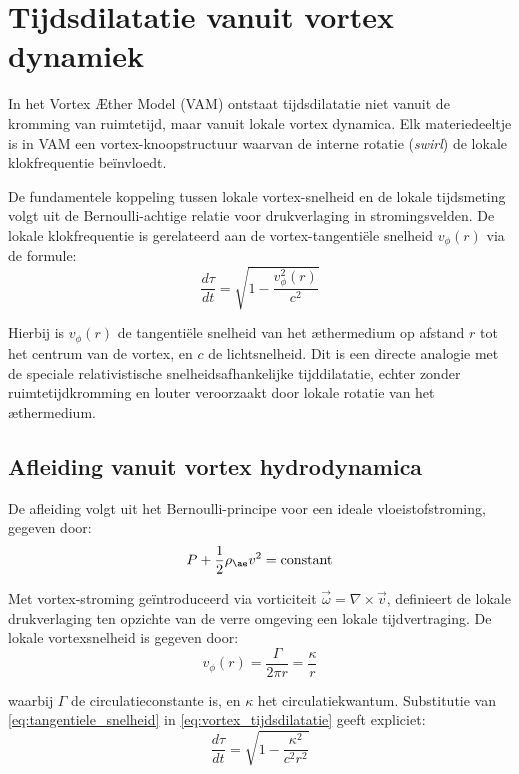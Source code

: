 \section{Tijdsdilatatie vanuit vortex dynamiek}

In het Vortex Æther Model (VAM) ontstaat tijdsdilatatie niet vanuit de kromming van ruimtetijd, maar vanuit lokale vortex dynamica. Elk materiedeeltje is in VAM een vortex-knoopstructuur waarvan de interne rotatie (\textit{swirl}) de lokale klokfrequentie beïnvloedt.

De fundamentele koppeling tussen lokale vortex-snelheid en de lokale tijdsmeting volgt uit de Bernoulli-achtige relatie voor drukverlaging in stromingsvelden. De lokale klokfrequentie is gerelateerd aan de vortex-tangentiële snelheid $v_{\phi}(r)$ via de formule:
\begin{equation}\label{eq:vortex_tijdsdilatatie}
    \frac{d\tau}{dt} = \sqrt{1 - \frac{v_{\phi}^2(r)}{c^2}}
\end{equation}

Hierbij is $v_{\phi}(r)$ de tangentiële snelheid van het æthermedium op afstand $r$ tot het centrum van de vortex, en $c$ de lichtsnelheid. Dit is een directe analogie met de speciale relativistische snelheidsafhankelijke tijddilatatie, echter zonder ruimtetijdkromming en louter veroorzaakt door lokale rotatie van het æthermedium.

\subsection{Afleiding vanuit vortex hydrodynamica}

De afleiding volgt uit het Bernoulli-principe voor een ideale vloeistofstroming, gegeven door:
\begin{equation}\label{eq:Bernoulli}
    P + \frac{1}{2}\rho_{\ae} v^2 = \text{constant}
\end{equation}

Met vortex-stroming geïntroduceerd via vorticiteit $\vec{\omega} = \nabla \times \vec{v}$, definieert de lokale drukverlaging ten opzichte van de verre omgeving een lokale tijdvertraging. De lokale vortexsnelheid is gegeven door:
\begin{equation}\label{eq:tangentiele_snelheid}
    v_{\phi}(r) = \frac{\Gamma}{2\pi r} = \frac{\kappa}{r}
\end{equation}

waarbij $\Gamma$ de circulatieconstante is, en $\kappa$ het circulatiekwantum. Substitutie van \eqref{eq:tangentiele_snelheid} in \eqref{eq:vortex_tijdsdilatatie} geeft expliciet:
\begin{equation}\label{eq:vortex_tijd_expliciet}
    \frac{d\tau}{dt} = \sqrt{1 - \frac{\kappa^2}{c^2 r^2}}
\end{equation}

